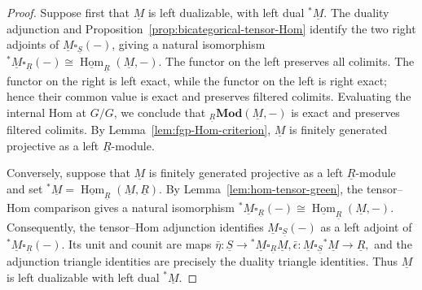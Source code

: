 \documentclass[11pt,oneside]{amsart}
\DeclareMathOperator{\Hom}{Hom}
\numberwithin{equation}{section}
\numberwithin{figure}{section}
\theoremstyle{plain}
\theoremstyle{definition}
\theoremstyle{remark}
\begin{document}
\begin{proof}
Suppose first that \(\underline M\) is left dualizable, with left dual
\({}^*\underline M\).  The duality adjunction and
Proposition~\ref{prop:bicategorical-tensor-Hom} identify the two right
adjoints of
\(\underline M\square_{\underline S}(-)\), giving a natural isomorphism
\(
{}^*\underline M\square_{\underline R}(-)
\cong
\underline{\Hom}_{\underline R}(\underline M,-).
\)
The functor on the left preserves all colimits.  The functor on the right
is left exact, while the functor on the left is right exact; hence their
common value is exact and preserves filtered colimits.  Evaluating the
internal Hom at \(G/G\), we conclude that
\({}_{\underline R}\mathbf{Mod}(\underline M,-)\) is exact and preserves
filtered colimits.  By Lemma~\ref{lem:fgp-Hom-criterion},
$\underline M$ is finitely generated projective as a left
$\underline R$-module.

Conversely, suppose that \(\underline M\) is finitely generated projective
as a left \(\underline R\)-module and set
\(
{}^*\underline M
=
\underline{\Hom}_{\underline R}(\underline M,\underline R).
\)
By Lemma~\ref{lem:hom-tensor-green}, the tensor--Hom comparison gives a
natural isomorphism
\(
{}^*\underline M\square_{\underline R}(-)
\cong
\underline{\Hom}_{\underline R}(\underline M,-).
\)
Consequently, the tensor--Hom adjunction identifies
\(\underline M\square_{\underline S}(-)\) as a left adjoint of
\({}^*\underline M\square_{\underline R}(-)\).  Its unit and counit are
maps
\(
\bar\eta\colon
\underline S\to 
{}^*\underline M\square_{\underline R}\underline M,
\bar\epsilon\colon
\underline M\square_{\underline S}{}^*\underline M
\to
\underline R,
\)
and the adjunction triangle identities are precisely the duality triangle
identities.  Thus \(\underline M\) is left dualizable with left dual
\({}^*\underline M\).
\end{proof}



 


{}

\end{document}
